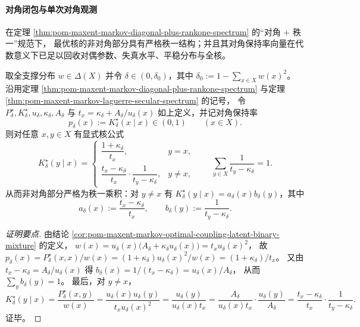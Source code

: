 \paragraph{对角闭包与单次对角观测}
在定理 \ref{thm:pom-maxent-markov-diagonal-plus-rankone-spectrum} 的“对角 \(+\) 秩一”规范下，
最优核的非对角部分具有严格秩一结构；并且其对角保持率向量在代数意义下已足以回收对偶参数、失真水平、平稳分布与全核。

\begin{proposition}\label{prop:pom-diagonal-rate-diagonal-closure-rankone}
取全支撑分布 \(w\in\Delta(X)\) 并令 \(\delta\in(0,\delta_0)\)，其中 \(\delta_0:=1-\sum_{x\in X}w(x)^2\)。
沿用定理 \ref{thm:pom-maxent-markov-diagonal-plus-rankone-spectrum} 与定理 \ref{thm:pom-maxent-markov-laguerre-secular-spectrum} 的记号，
令 \(P^\star_\delta,K^\star_\delta,u_\delta,\kappa_\delta,A_\delta\) 与
\(
t_x=\kappa_\delta+A_\delta/u_\delta(x)
\)
如上定义，并记对角保持率
\[
p_\delta(x):=K^\star_\delta(x\mid x)\in(0,1)\qquad(x\in X).
\]
则对任意 \(x,y\in X\) 有显式核公式
\[
K^\star_\delta(y\mid x)=
\begin{cases}
\dfrac{1+\kappa_\delta}{t_x},&y=x,\\[8pt]
\dfrac{t_x-\kappa_\delta}{t_x}\cdot\dfrac{1}{t_y-\kappa_\delta},&y\ne x,
\end{cases}
\qquad
\sum_{y\in X}\frac{1}{t_y-\kappa_\delta}=1.
\]
从而非对角部分严格为秩一乘积：对 \(y\ne x\) 有 \(K^\star_\delta(y\mid x)=a_\delta(x)b_\delta(y)\)，其中
\[
a_\delta(x):=\frac{t_x-\kappa_\delta}{t_x},
\qquad
b_\delta(y):=\frac{1}{t_y-\kappa_\delta}.
\]
\end{proposition}
\begin{proof}[证明要点]
由结论 \ref{cor:pom-maxent-markov-optimal-coupling-latent-binary-mixture} 的定义，
\(
w(x)=u_\delta(x)\bigl(A_\delta+\kappa_\delta u_\delta(x)\bigr)
=t_xu_\delta(x)^2
\)，
故
\(
p_\delta(x)=P^\star_\delta(x,x)/w(x)=(1+\kappa_\delta)u_\delta(x)^2/w(x)=(1+\kappa_\delta)/t_x
\)。
又由 \(t_x-\kappa_\delta=A_\delta/u_\delta(x)\) 得
\(
b_\delta(x)=1/(t_x-\kappa_\delta)=u_\delta(x)/A_\delta
\)，
从而 \(\sum_y b_\delta(y)=1\)。
最后，对 \(y\ne x\)，
\[
K^\star_\delta(y\mid x)=\frac{P^\star_\delta(x,y)}{w(x)}=\frac{u_\delta(x)u_\delta(y)}{t_xu_\delta(x)^2}
=\frac{u_\delta(y)}{u_\delta(x)t_x}
=\frac{A_\delta}{u_\delta(x)t_x}\cdot \frac{u_\delta(y)}{A_\delta}
=\frac{t_x-\kappa_\delta}{t_x}\cdot\frac{1}{t_y-\kappa_\delta}.
\]
证毕。
\end{proof}

